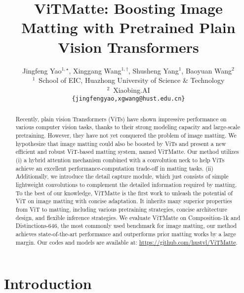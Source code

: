 \documentclass[10pt,twocolumn,letterpaper]{article}
\newcommand{\thename}{ViTMatte}
\begin{document}
\title{ViTMatte: Boosting Image Matting with Pretrained Plain Vision Transformers}

\author{
Jingfeng Yao$^{1,\star}$,
Xinggang Wang$^{1,\dagger}$,
Shusheng Yang$^{1}$,
Baoyuan Wang$^{2}$
\\
[2mm]
$^1$~School of EIC, Huazhong University of Science \& Technology\\ 
$^2$~Xiaobing.AI
\\ 
\normalsize{
\texttt{\{jingfengyao,xgwang@hust.edu.cn\}}}}

\maketitle

\let\thefootnote\relax{}

\begin{abstract}
Recently, plain vision Transformers (ViTs) have shown impressive performance on various computer vision tasks, thanks to their strong modeling capacity and large-scale pretraining. However, they have not yet conquered the problem of image matting. We hypothesize that image matting could also be boosted by ViTs and present a new efficient and robust ViT-based matting system, named \thename{}. Our method utilizes (i) a hybrid attention mechanism combined with a convolution neck to help ViTs achieve an excellent performance-computation trade-off in matting tasks. (ii) Additionally, we introduce the detail capture module, which just consists of simple lightweight convolutions to complement the detailed information required by matting. To the best of our knowledge, \thename{} is the first work to unleash the potential of ViT on image matting with concise adaptation. It inherits many superior properties from ViT to matting, including various pretraining strategies, concise architecture design, and flexible inference strategies. We evaluate \thename{} on Composition-1k and Distinctions-646, the most commonly used benchmark for image matting, our method achieves state-of-the-art performance and outperforms prior matting works by a large margin. Our codes and models are available at: \href{https://github.com/hustvl/ViTMatte}{https://github.com/hustvl/ViTMatte}.
\end{abstract}

\section{Introduction}
\end{document}
